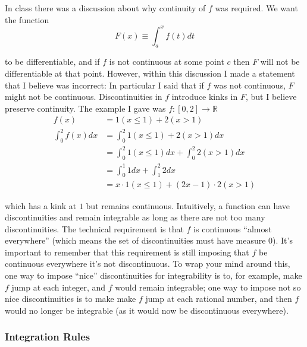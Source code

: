 \documentclass{article}
\begin{document}
\begin{remark}
  In class there was a discussion about why continuity of $f$ was required. We want the function
  \[
    F(x) \equiv \displaystyle\int_a^x f(t) dt
  \]

  to be differentiable, and if $f$ is not continuous at some point $c$ then $F$ will not be differentiable at that point. However, within this discussion I made a statement that I believe was incorrect: In particular I said that if $f$ was not continuous, $F$ might not be continuous. Discontinuities in $f$ introduce kinks in $F$, but I believe preserve continuity. The example I gave was $f: [0, 2] \to \mathbb{R}$
  \begin{align*}
    f(x) & = 1(x \le 1) + 2(x > 1)
    \\
    \int_{0}^{2} f(x) dx
    & =
    \int_{0}^{2} 1(x \le 1) + 2(x > 1) dx
    \\
    & =
    \int_{0}^{2} 1(x \le 1) dx
    +
    \int_{0}^{2} 2(x > 1) dx
    \\
    & =
    \int_{0}^{1} 1 dx
    +
    \int_{1}^{2} 2 dx
    \\
    & =
    x \cdot 1(x \le 1)
    +
    (2x - 1) \cdot 2(x > 1)
  \end{align*}

  which has a kink at $1$ but remains continuous. Intuitively, a function can have discontinuities and remain integrable as long as there are not too many discontinuities. The technical requirement is that $f$ is continuous ``almost everywhere'' (which means the set of discontinuities must have measure $0$). It's important to remember that this requirement is still imposing that $f$ be continuous everywhere it's not discontinuous. To wrap your mind around this, one way to impose ``nice'' discontinuities for integrability is to, for example, make $f$ jump at each integer, and $f$ would remain integrable; one way to impose not so nice discontinuities is to make make $f$ jump at each rational number, and then $f$ would no longer be integrable (as it would now be discontinuous everywhere).
\end{remark}

\subsubsection{Integration Rules}
\label{ssub:integration_rules}
\end{document}

